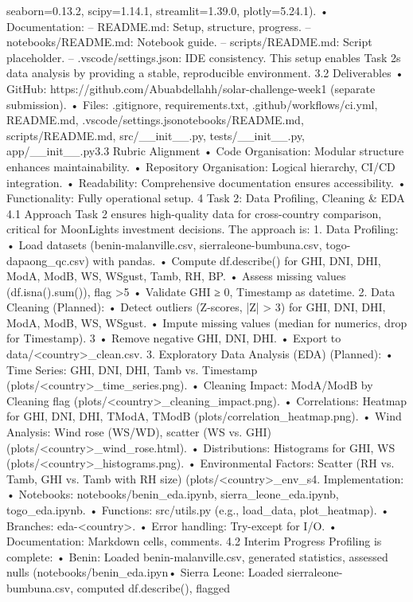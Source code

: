 seaborn=0.13.2, scipy=1.14.1, streamlit=1.39.0, plotly=5.24.1).
• Documentation:
– README.md: Setup, structure, progress.
– notebooks/README.md: Notebook guide.
– scripts/README.md: Script placeholder.
– .vscode/settings.json: IDE consistency.
This setup enables Task 2s data analysis by providing a stable, reproducible environment.
3.2 Deliverables
• GitHub: https://github.com/Abuabdellahh/solar-challenge-week1 (separate submission).
• Files: .gitignore, requirements.txt, .github/workflows/ci.yml, README.md, .vscode/settings.jsonotebooks/README.md, scripts/README.md, src/__init__.py, tests/__init__.py, app/__init__.py3.3 Rubric Alignment
• Code Organisation: Modular structure enhances maintainability.
• Repository Organisation: Logical hierarchy, CI/CD integration.
• Readability: Comprehensive documentation ensures accessibility.
• Functionality: Fully operational setup.
4 Task 2: Data Profiling, Cleaning & EDA
4.1 Approach
Task 2 ensures high-quality data for cross-country comparison, critical for MoonLights investment decisions. The approach is:
1. Data Profiling:
• Load datasets (benin-malanville.csv, sierraleone-bumbuna.csv, togo-dapaong_qc.csv)
with pandas.
• Compute df.describe() for GHI, DNI, DHI, ModA, ModB, WS, WSgust, Tamb,
RH, BP.
• Assess missing values (df.isna().sum()), flag >5%
• Validate GHI ≥ 0, Timestamp as datetime.
2. Data Cleaning (Planned):
• Detect outliers (Z-scores, |Z| > 3) for GHI, DNI, DHI, ModA, ModB, WS, WSgust.
• Impute missing values (median for numerics, drop for Timestamp).
3
• Remove negative GHI, DNI, DHI.
• Export to data/<country>_clean.csv.
3. Exploratory Data Analysis (EDA) (Planned):
• Time Series: GHI, DNI, DHI, Tamb vs. Timestamp (plots/<country>_time_series.png).
• Cleaning Impact: ModA/ModB by Cleaning flag (plots/<country>_cleaning_impact.png).
• Correlations: Heatmap for GHI, DNI, DHI, TModA, TModB (plots/correlation_heatmap.png).
• Wind Analysis: Wind rose (WS/WD), scatter (WS vs. GHI) (plots/<country>_wind_rose.html).
• Distributions: Histograms for GHI, WS (plots/<country>_histograms.png).
• Environmental Factors: Scatter (RH vs. Tamb, GHI vs. Tamb with RH size) (plots/<country>_env_s4. Implementation:
• Notebooks: notebooks/benin_eda.ipynb, sierra_leone_eda.ipynb, togo_eda.ipynb.
• Functions: src/utils.py (e.g., load_data, plot_heatmap).
• Branches: eda-<country>.
• Error handling: Try-except for I/O.
• Documentation: Markdown cells, comments.
4.2 Interim Progress
Profiling is complete:
• Benin: Loaded benin-malanville.csv, generated statistics, assessed nulls (notebooks/benin_eda.ipyn• Sierra Leone: Loaded sierraleone-bumbuna.csv, computed df.describe(), flagged
